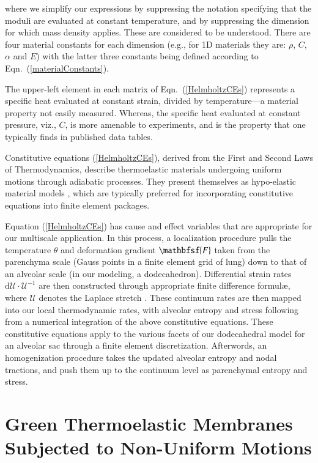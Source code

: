 where we simplify our expressions by suppressing the notation specifying that the moduli are evaluated at constant temperature, and by suppressing the dimension for which mass density applies.  These are considered to be understood.  There are four material constants for each dimension (e.g., for 1D materials they are: $\rho$, $C$, $\alpha$ and $E$) with the latter three constants being defined according to Eqn.~(\ref{materialConstants}).

The upper-left element in each matrix of Eqn.~(\ref{HelmholtzCEs}) represents a specific heat evaluated at constant strain, divided by temperature---a material property not easily measured.  Whereas, the specific heat evaluated at constant pressure, viz., $C$, is more amenable to experiments, and is the property that one typically finds in published data tables.  

Constitutive equations (\ref{HelmholtzCEs}), derived from the First and Second Laws of Thermo\-dynamics, describe thermo\-elastic materials undergoing uniform motions through adiabatic processes.  They present themselves as hypo-elastic material models \cite{Truesdell55}, which are typically preferred for incorporating constitutive equations into finite element packages.

Equation (\ref{HelmholtzCEs}) has cause and effect variables that are appropriate for our multi\-scale application.  In this process, a localization procedure pulls the temperature $\theta$ and deformation gradient $\mathbfsf{F}$ taken from the parenchyma scale (Gauss points in a finite element grid of lung) down to that of an alveolar scale (in our modeling, a dodecahedron).  Differential strain rates $\mathrm{d} \boldsymbol{\mathcal{U}} \cdot \boldsymbol{\mathcal{U}}^{-1}$ are then constructed through appropriate finite difference formul\ae, where $\boldsymbol{\mathcal{U}}$ denotes the Laplace stretch \cite{Freedetal19}. These continuum rates are then mapped into our local thermo\-dynamic rates, with alveolar entropy and stress following from a numerical integration of the above constitutive equations.  These constitutive equations apply to the various facets of our dodecahedral model for an alveolar sac through a finite element discretization.  Afterwords, an homogenization procedure takes the updated alveolar entropy and nodal tractions, and push them up to the continuum level as parenchymal entropy and stress. 

\section{Green Thermoelastic Membranes Subjected to Non-Uniform Motions}
\label{secNonuniform2D}

